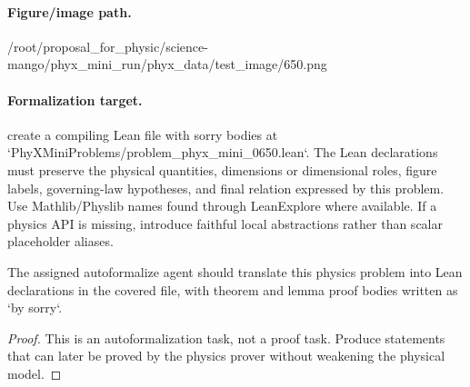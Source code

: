 \paragraph{Figure/image path.}
/root/proposal\_for\_physic/science-mango/phyx\_mini\_run/phyx\_data/test\_image/650.png

\paragraph{Formalization target.}
create a compiling Lean file with sorry bodies at `PhyXMiniProblems/problem\_phyx\_mini\_0650.lean`. The Lean declarations must preserve the physical quantities, dimensions or dimensional roles, figure labels, governing-law hypotheses, and final relation expressed by this problem.
Use Mathlib/Physlib names found through LeanExplore where available. If a physics API is missing, introduce faithful local abstractions rather than scalar placeholder aliases.

\begin{theorem}
\label{thm:physics:phyx_mini_0650:target}
The assigned autoformalize agent should translate this physics problem into Lean declarations in the covered file, with theorem and lemma proof bodies written as `by sorry`.
\end{theorem}
\begin{proof}
This is an autoformalization task, not a proof task. Produce statements that can later be proved by the physics prover without weakening the physical model.
\end{proof}

